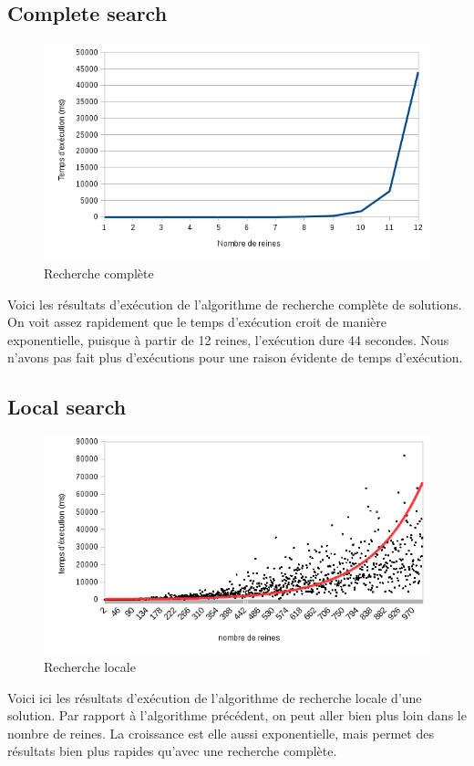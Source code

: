 \documentclass{article}
\begin{document}
\subsection{Complete search}
\begin{figure}[!h]
	\caption{\label{csearch} Recherche complète}
	\begin{center}
	\includegraphics[scale=0.5]{./picture/compelte_search.png}
	\end{center}
\end{figure}
Voici les résultats d'exécution de l'algorithme de recherche complète de solutions. On voit assez rapidement que le temps d'exécution croit de manière exponentielle, puisque à partir de 12 reines, l'exécution dure 44 secondes. Nous n'avons pas fait plus d'exécutions pour une raison évidente de temps d'exécution.

\subsection{Local search}
\begin{figure}[!h]
	\caption{\label{lsearch} Recherche locale}
	\begin{center}
	\includegraphics[scale=0.5]{./picture/local_search.png}
	\end{center}
\end{figure}
Voici ici les résultats d'exécution de l'algorithme de recherche locale d'une solution. Par rapport à l'algorithme précédent, on peut aller bien plus loin dans le nombre de reines. La croissance est elle aussi exponentielle, mais permet des résultats bien plus rapides qu'avec une recherche complète. 
\end{document}
